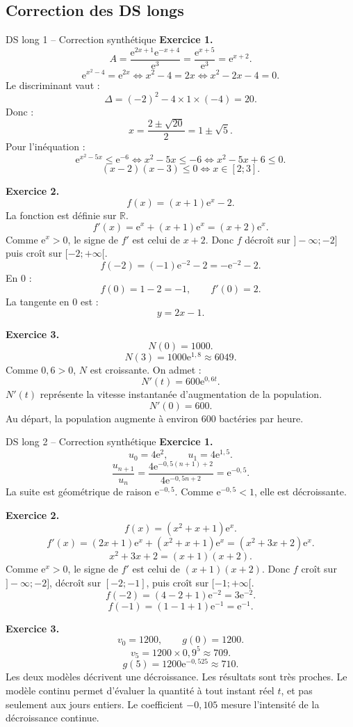 \documentclass[11pt,a4paper]{article}
\newcommand{\R}{\mathbb{R}}
\newcommand{\e}{\mathrm{e}}
\begin{document}
\subsection{Correction des DS longs}

\begin{correctionbox}{DS long 1 -- Correction synthétique}
\textbf{Exercice 1.}
\[
A=\frac{\e^{2x+1}\e^{-x+4}}{\e^3}
=\frac{\e^{x+5}}{\e^3}
=\e^{x+2}.
\]
\[
\e^{x^2-4}=\e^{2x}
\Longleftrightarrow x^2-4=2x
\Longleftrightarrow x^2-2x-4=0.
\]
Le discriminant vaut :
\[
\Delta=(-2)^2-4\times1\times(-4)=20.
\]
Donc :
\[
x=\frac{2\pm\sqrt{20}}{2}=1\pm\sqrt5.
\]
Pour l'inéquation :
\[
\e^{x^2-5x}\leq\e^{-6}
\Longleftrightarrow x^2-5x\leq -6
\Longleftrightarrow x^2-5x+6\leq0.
\]
\[
(x-2)(x-3)\leq0
\Longleftrightarrow x\in[2;3].
\]

\medskip

\textbf{Exercice 2.}
\[
f(x)=(x+1)\e^x-2.
\]
La fonction est définie sur $\R$.
\[
f'(x)=\e^x+(x+1)\e^x=(x+2)\e^x.
\]
Comme $\e^x>0$, le signe de $f'$ est celui de $x+2$.
Donc $f$ décroît sur $]-\infty;-2]$ puis croît sur $[-2;+\infty[$.
\[
f(-2)=(-1)\e^{-2}-2=-\e^{-2}-2.
\]
En $0$ :
\[
f(0)=1-2=-1,
\qquad
f'(0)=2.
\]
La tangente en $0$ est :
\[
y=2x-1.
\]

\medskip

\textbf{Exercice 3.}
\[
N(0)=1000.
\]
\[
N(3)=1000\e^{1,8}\approx6049.
\]
Comme $0,6>0$, $N$ est croissante.
On admet :
\[
N'(t)=600\e^{0,6t}.
\]
$N'(t)$ représente la vitesse instantanée d'augmentation de la population.
\[
N'(0)=600.
\]
Au départ, la population augmente à environ $600$ bactéries par heure.
\end{correctionbox}

\begin{correctionbox}{DS long 2 -- Correction synthétique}
\textbf{Exercice 1.}
\[
u_0=4\e^2,
\qquad
u_1=4\e^{1,5}.
\]
\[
\frac{u_{n+1}}{u_n}
=
\frac{4\e^{-0,5(n+1)+2}}{4\e^{-0,5n+2}}
=
\e^{-0,5}.
\]
La suite est géométrique de raison $\e^{-0,5}$. Comme $\e^{-0,5}<1$, elle est décroissante.

\medskip

\textbf{Exercice 2.}
\[
f(x)=(x^2+x+1)\e^x.
\]
\[
f'(x)=(2x+1)\e^x+(x^2+x+1)\e^x
=(x^2+3x+2)\e^x.
\]
\[
x^2+3x+2=(x+1)(x+2).
\]
Comme $\e^x>0$, le signe de $f'$ est celui de $(x+1)(x+2)$.
Donc $f$ croît sur $]-\infty;-2]$, décroît sur $[-2;-1]$, puis croît sur $[-1;+\infty[$.
\[
f(-2)=(4-2+1)\e^{-2}=3\e^{-2}.
\]
\[
f(-1)=(1-1+1)\e^{-1}=\e^{-1}.
\]

\medskip

\textbf{Exercice 3.}
\[
v_0=1200,
\qquad
g(0)=1200.
\]
\[
v_5=1200\times0,9^5\approx709.
\]
\[
g(5)=1200\e^{-0,525}\approx710.
\]
Les deux modèles décrivent une décroissance. Les résultats sont très proches. Le modèle continu permet d'évaluer la quantité à tout instant réel $t$, et pas seulement aux jours entiers. Le coefficient $-0,105$ mesure l'intensité de la décroissance continue.
\end{correctionbox}
\end{document}
